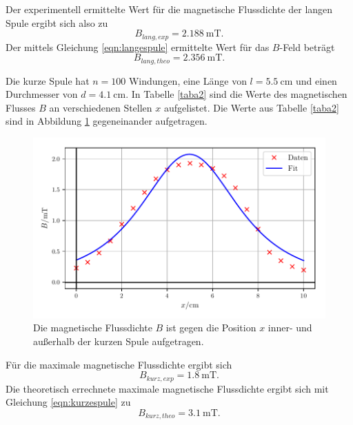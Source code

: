 \noindent Der experimentell ermittelte Wert für die 
magnetische Flussdichte der langen Spule ergibt sich also zu
\begin{equation*}
    B_{lang,exp} = \SI{2.188}{\milli\tesla}.
\end{equation*}
Der mittels Gleichung \eqref{eqn:langespule} ermittelte Wert für
das $B$-Feld beträgt
\begin{equation*}
    B_{lang,theo} = \SI{2.356}{\milli\tesla}.
\end{equation*}

\newpage %
Die kurze Spule hat $n = \num{100}$ Windungen, eine Länge von
$l = \SI{5.5}{\centi\meter}$ und einen Durchmesser von
$d = \SI{4.1}{\centi\meter}$.
In Tabelle \ref{taba2} sind die Werte des magnetischen Flusses $B$
an verschiedenen Stellen $x$ aufgelistet.
Die Werte aus Tabelle \ref{taba2} sind in Abbildung \ref{plota2}
gegeneinander aufgetragen.


\begin{figure}
    \centering
    \includegraphics{build/plota2.pdf}
    \caption{Die magnetische Flussdichte $B$ ist gegen die Position $x$ inner-
    und außerhalb der kurzen Spule aufgetragen.}
    \label{plota2}
\end{figure}

\noindent Für die maximale magnetische Flussdichte ergibt sich 
\begin{equation*}
   B_{kurz,exp} = \SI{1.8}{\milli\tesla}.
\end{equation*}
Die theoretisch errechnete maximale magnetische Flussdichte
ergibt sich mit Gleichung \eqref{eqn:kurzespule} zu
\begin{equation*}
   B_{kurz,theo} = \SI{3.1}{\milli\tesla}.
\end{equation*}


